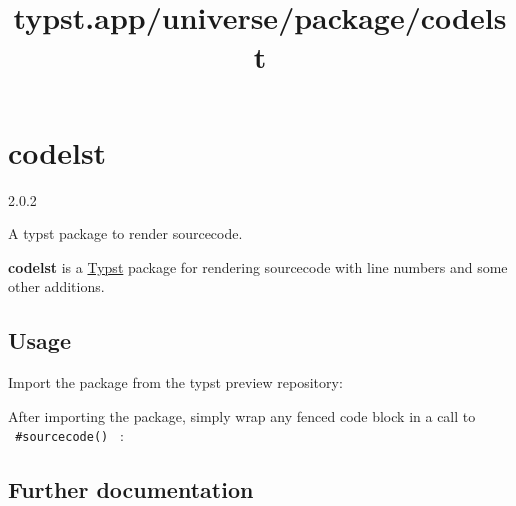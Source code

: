 \title{typst.app/universe/package/codelst}

\label{banner}
\section{codelst}\label{codelst}

{ 2.0.2 }

A typst package to render sourcecode.

\label{readme}
\textbf{codelst} is a \href{https://github.com/typst/typst}{Typst}
package for rendering sourcecode with line numbers and some other
additions.

\subsection{Usage}\label{usage}

Import the package from the typst preview repository:

\begin{Shaded}
\begin{Highlighting}[]
\OperatorTok{:}
\end{Highlighting}
\end{Shaded}

After importing the package, simply wrap any fenced code block in a call
to \texttt{\ \#sourcecode()\ } :

\begin{Shaded}
\begin{Highlighting}[]
\OperatorTok{:}

\NormalTok{\#sourcecode[}
\VerbatimStringTok{\#show "ArtosFlow": name =\textgreater{} box[}
\VerbatimStringTok{  ))}
\VerbatimStringTok{]}

\VerbatimStringTok{\textasciigrave{}\textasciigrave{}\textasciigrave{}}\NormalTok{]}
\end{Highlighting}
\end{Shaded}

\subsection{Further documentation}\label{further-documentation}

